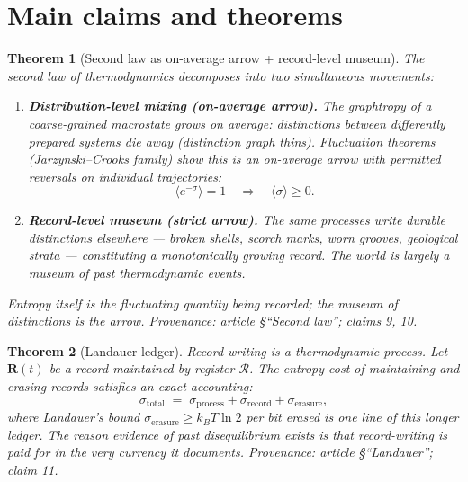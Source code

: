 \documentclass[11pt]{article}
\newtheorem{theorem}{Theorem}
\newcommand{\cR}{\mathcal{R}}
\begin{document}
\section{Main claims and theorems}

\begin{theorem}[Second law as on-average arrow + record-level museum]
  \label{thm:secondlaw}
The second law of thermodynamics decomposes into two simultaneous movements:
\begin{enumerate}
  \item \textbf{Distribution-level mixing (on-average arrow).}  The
    graphtropy of a coarse-grained macrostate grows on average: distinctions
    between differently prepared systems die away (distinction graph thins).
    Fluctuation theorems (Jarzynski--Crooks family) show this is an on-average
    arrow with permitted reversals on individual trajectories:
    \[
      \bigl\langle e^{-\sigma} \bigr\rangle = 1
      \quad\Longrightarrow\quad
      \langle \sigma \rangle \geq 0.
    \]
  \item \textbf{Record-level museum (strict arrow).}  The same processes write
    durable distinctions elsewhere — broken shells, scorch marks, worn grooves,
    geological strata — constituting a monotonically growing record.
    The world is largely a museum of past thermodynamic events.
\end{enumerate}
Entropy itself is the fluctuating quantity being recorded; the museum of
distinctions is the arrow.
\emph{Provenance: article \S``Second law''; claims 9, 10.}
\end{theorem}

\begin{theorem}[Landauer ledger]\label{thm:landauer}
Record-writing is a thermodynamic process.  Let $\mathbf{R}(t)$ be a record
maintained by register $\cR$.  The entropy cost of maintaining and erasing
records satisfies an exact accounting:
\[
  \sigma_{\mathrm{total}} \;=\; \sigma_{\mathrm{process}} + \sigma_{\mathrm{record}} + \sigma_{\mathrm{erasure}},
\]
where Landauer's bound $\sigma_{\mathrm{erasure}} \geq k_B T \ln 2$ per bit
erased is one line of this longer ledger.  The reason evidence of past
disequilibrium exists is that record-writing is paid for in the very currency
it documents.
\emph{Provenance: article \S``Landauer''; claim 11.}
\end{theorem}
\end{document}
